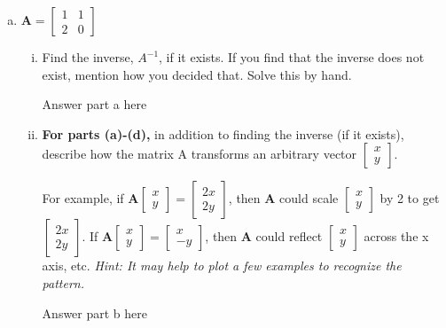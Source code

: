 \documentclass[11pt]{article}
\def\A{\textbf{A}} %
\begin{document}
\begin{enumerate}
\begin{enumerate}[(a)]
	      	\newpage
	      	\item $\A = \begin{bmatrix}
	      	      1 & 1 \\
	      	      2 & 0
	      	\end{bmatrix}$
	      	\begin{enumerate}[i.]
	      		\item Find the inverse, $A^{-1}$, if it exists. If you find that the inverse does not exist, mention how you decided that. Solve this by hand.
	      		      \begin{Answer}
	      		      	Answer part a here
	      		      \end{Answer}
	      		\item \textbf{For parts (a)-(d),} in addition to finding the inverse (if it exists), describe how the matrix A transforms an arbitrary vector $\begin{bmatrix}
	      		      x \\
	      		      y
	      		\end{bmatrix}$.
	      			      			      		                    
	      		For example, if $\A \begin{bmatrix}
	      		x \\
	      		y
	      		\end{bmatrix} = \begin{bmatrix}
	      		2x \\
	      		2y
	      		\end{bmatrix}$, then $\A$ could scale $\begin{bmatrix}
	      		x \\
	      		y
	      		\end{bmatrix}$ by 2 to get $\begin{bmatrix}
	      		2x \\
	      		2y
	      		\end{bmatrix}$. If $\A \begin{bmatrix}
	      		x \\
	      		y
	      		\end{bmatrix}
	      		=
	      		\begin{bmatrix}
	      			x  \\
	      			-y 
	      		\end{bmatrix}$, then $\A$ could reflect $\begin{bmatrix}
	      		x \\
	      		y
	      		\end{bmatrix}$ across the x axis, etc. \textit{Hint: It may help to plot a few examples to recognize the pattern.}
	      		\begin{Answer}
	      			Answer part b here
	      		\end{Answer}
	      	\end{enumerate}
	      		      		      		                    

\end{enumerate}
\end{enumerate}
\end{document}
